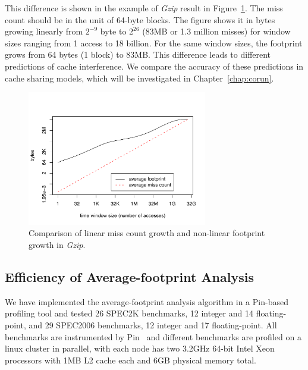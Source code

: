 This difference is shown in the example of \emph{Gzip} result in
Figure~\ref{fig:miss-fp-comp}.  The miss count should be in the unit of
64-byte blocks.  The figure shows it in bytes growing linearly from
$2^{-9}$ byte to $2^{26}$ (83MB or 1.3 million misses) for window
sizes ranging from 1 access to 18 billion.  For the same window sizes,
the footprint grows from 64 bytes (1 block) to 83MB.  This difference
leads to different predictions of cache interference.  We compare
the accuracy of these predictions in cache sharing models, which will
be investigated in Chapter~\ref{chap:corun}.

\begin{figure}[h]
\centering
\includegraphics[width=0.7\textwidth]{figures/fp/miss_fp_comp}
\caption{Comparison of linear miss count growth and non-linear
  footprint growth in \emph{Gzip}.}
\label{fig:miss-fp-comp}
\end{figure}


\subsection{Efficiency of Average-footprint Analysis}
\label{subsec:fp-eval-aver-fp}
We have implemented the average-footprint analysis algorithm in a
Pin-based profiling tool
and tested 26 SPEC2K benchmarks, 12 integer and 14 floating-point,
and 29 SPEC2006 benchmarks, 12 integer and 17 floating-point. All
benchmarks are instrumented by Pin~\cite{Pin:PLDI05} and different
benchmarks are profiled on a linux cluster in parallel, with each node
has two 3.2GHz 64-bit Intel Xeon processors with 1MB L2 cache each and
6GB physical memory total.

